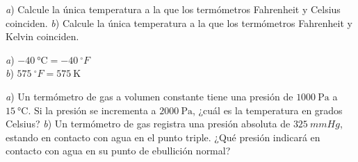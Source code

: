 \setcounter{figure}{0}
%
\begin{Exercise}
  \textit{a}) Calcule la única temperatura a la que los termómetros Fahrenheit y Celsius coinciden. \textit{b}) Calcule la única temperatura a la que los termómetros Fahrenheit y Kelvin coinciden.
\end{Exercise}
\begin{Answer}
	\begin{minipage}[t]{.4\textwidth}
    \textit{a}) $\SI{-40}{\celsius}=\SI{-40}{^\circ F}$\\ \textit{b}) $\SI{575}{^\circ F}=\SI{575}{\kelvin}$
  \end{minipage}
\end{Answer}
%
\begin{Exercise}
  \textit{a}) Un termómetro de gas a volumen constante tiene una presión de $\SI{1000}{\pascal}$ a $\SI{15}{\celsius}$. Si la presión se incrementa a $\SI{2000}{\pascal}$, ¿cuál es la temperatura en grados Celsius? \textit{b}) Un termómetro de gas registra una presión absoluta de $\SI{325}{mmHg}$, estando en contacto con agua en el punto triple. ¿Qué presión indicará en contacto con agua en su punto de ebullición normal?
\end{Exercise}
